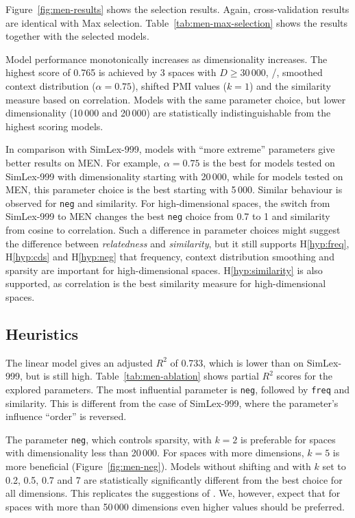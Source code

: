 

Figure~\ref{fig:men-results} shows the selection results. Again, cross-validation results are identical with Max selection. Table~\ref{tab:men-max-selection} shows the results together with the selected models.

Model performance monotonically increases as dimensionality increases. The highest score of 0.765 is achieved by 3 spaces with $D \geq 30\,000$, \logNSCPMI/, smoothed context distribution ($\alpha = 0.75$), shifted PMI values ($k = 1$) and the similarity measure based on correlation. Models with the same parameter choice, but lower dimensionality (10\,000 and 20\,000) are statistically indistinguishable from the highest scoring models.

In comparison with SimLex-999, models with ``more extreme'' parameters give better results on MEN. For example, $\alpha = 0.75$ is the best for models tested on SimLex-999 with dimensionality starting with 20\,000, while for models tested on MEN, this parameter choice is the best starting with 5\,000. Similar behaviour is observed for \texttt{neg} and similarity. For high-dimensional spaces, the switch from SimLex-999 to MEN changes the best \texttt{neg} choice from 0.7 to 1 and similarity from cosine to correlation. Such a difference in parameter choices might suggest the difference between \textit{relatedness} and \textit{similarity}, but it still supports H\ref{hyp:freq}, H\ref{hyp:cds} and H\ref{hyp:neg} that frequency, context distribution smoothing and sparsity are important for high-dimensional spaces. H\ref{hyp:similarity} is also supported, as correlation is the best similarity measure for high-dimensional spaces.

\subsection{Heuristics}
\label{sec:heuristics-men}




The linear model gives an adjusted $R^2$ of 0.733, which is lower than on SimLex-999, but is still high. Table~\ref{tab:men-ablation} shows partial $R^2$ scores for the explored parameters. The most influential parameter is \texttt{neg}, followed by \texttt{freq} and similarity. This is different from the case of SimLex-999, where the parameter's influence ``order'' is reversed.

 The parameter \texttt{neg}, which controls sparsity, with $k = 2$ is preferable for spaces with dimensionality less than 20\,000. For spaces with more dimensions, $k = 5$ is more beneficial (Figure~\ref{fig:men-neg}). Models without shifting and with $k$ set to 0.2, 0.5, 0.7 and 7 are statistically significantly different from the best choice for all dimensions. This replicates the suggestions of . We, however, expect that for spaces with more than 50\,000 dimensions even higher values should be preferred.

